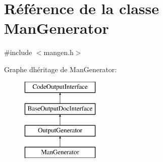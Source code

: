 \hypertarget{class_man_generator}{}\section{Référence de la classe Man\+Generator}
\label{class_man_generator}


{\ttfamily \#include $<$mangen.\+h$>$}

Graphe d\textquotesingle{}héritage de Man\+Generator\+:\begin{figure}[H]
\begin{center}
\leavevmode
\includegraphics[height=4.000000cm]{class_man_generator}
\end{center}
\end{figure}
